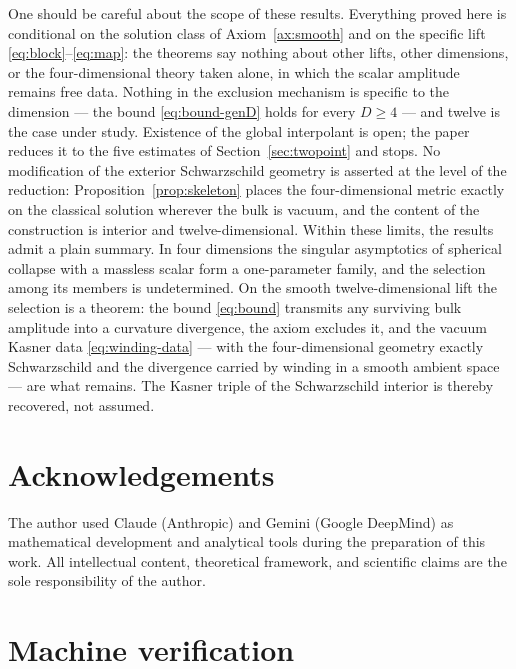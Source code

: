 \documentclass[11pt]{article}
\numberwithin{equation}{section}
\theoremstyle{plain}
\theoremstyle{definition}
\theoremstyle{remark}
\begin{document}
One should be careful about the scope of these results. Everything
proved here is conditional on the solution class of
Axiom~\ref{ax:smooth} and on the specific lift
\eqref{eq:block}--\eqref{eq:map}: the theorems say nothing about other
lifts, other dimensions, or the four-dimensional theory taken alone,
in which the scalar amplitude remains free data. Nothing in the
exclusion mechanism is specific to the dimension --- the bound
\eqref{eq:bound-genD} holds for every $D \geq 4$ --- and twelve is the
case under study. Existence of the
global interpolant is open; the paper reduces it to the five estimates
of Section~\ref{sec:twopoint} and stops. No modification of the
exterior Schwarzschild geometry is asserted at the level of the
reduction: Proposition~\ref{prop:skeleton} places the four-dimensional
metric exactly on the classical solution wherever the bulk is vacuum,
and the content of the construction is interior and
twelve-dimensional. Within these limits, the results admit a plain
summary. In four dimensions the singular asymptotics of spherical
collapse with a massless scalar form a one-parameter family, and the
selection among its members is undetermined. On the smooth
twelve-dimensional lift the selection is a theorem: the bound
\eqref{eq:bound} transmits any surviving bulk amplitude into a
curvature divergence, the axiom excludes it, and the vacuum Kasner
data \eqref{eq:winding-data} --- with the four-dimensional geometry
exactly Schwarzschild and the divergence carried by winding in a
smooth ambient space --- are what remains. The Kasner triple of the
Schwarzschild interior is thereby recovered, not assumed.

\section*{Acknowledgements}

The author used Claude (Anthropic) and Gemini (Google DeepMind) as
mathematical development and analytical tools during the preparation
of this work. All intellectual content, theoretical framework, and
scientific claims are the sole responsibility of the author.

\appendix

\section{Machine verification}\label{app:lean}
\end{document}
